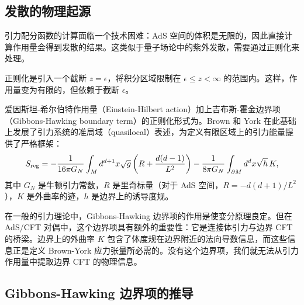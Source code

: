 \subsection{发散的物理起源}

引力配分函数的计算面临一个技术困难：AdS 空间的体积是无限的，因此直接计算作用量会得到发散的结果。这类似于量子场论中的紫外发散，需要通过正则化来处理。

\begin{definition}[正则化]
正则化是引入一个截断 $z = \epsilon$，将积分区域限制在 $\epsilon \leq z < \infty$ 的范围内。这样，作用量变为有限的，但依赖于截断 $\epsilon$。
\end{definition}

爱因斯坦-希尔伯特作用量（Einstein-Hilbert action）加上吉布斯-霍金边界项（Gibbons-Hawking boundary term）\cite{Gibbons1977}的正则化形式为。Brown 和 York\cite{Brown1993} 在此基础上发展了引力系统的准局域（quasilocal）表述，为定义有限区域上的引力能量提供了严格框架：
\begin{equation}
    S_{\rm reg} = -\frac{1}{16\pi G_N} \int_{M} d^{d+1}x \sqrt{g} \left( R + \frac{d(d-1)}{L^2} \right) - \frac{1}{8\pi G_N} \int_{\partial M} d^d x \sqrt{h} \, K,
\end{equation}
其中 $G_N$ 是牛顿引力常数，$R$ 是里奇标量（对于 AdS 空间，$R = -d(d+1)/L^2$），$K$ 是外曲率的迹，$h$ 是边界上的诱导度规。

\begin{note}
在一般的引力理论中，Gibbons-Hawking 边界项的作用是使变分原理良定。但在 AdS/CFT 对偶中，这个边界项具有额外的重要性：它是连接体引力与边界 CFT 的桥梁。边界上的外曲率 $K$ 包含了体度规在边界附近的法向导数信息，而这些信息正是定义 Brown-York 应力张量\cite{Brown1993}所必需的。没有这个边界项，我们就无法从引力作用量中提取边界 CFT 的物理信息\cite{Balasubramanian1999}。
\end{note}

\subsection{Gibbons-Hawking 边界项的推导}

